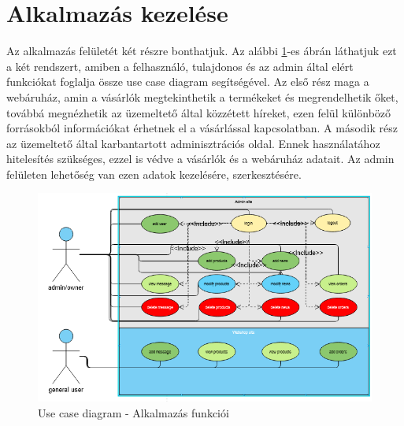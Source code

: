 \section{Alkalmazás kezelése}
Az alkalmazás felületét két részre bonthatjuk. Az alábbi \ref{fig.exemple-1}-es ábrán láthatjuk ezt a két rendszert, amiben a felhasználó, tulajdonos és az admin által elért funkciókat foglalja össze use case diagram segítségével. Az első rész maga a webáruház, amin a vásárlók megtekinthetik a termékeket és megrendelhetik őket, továbbá megnézhetik az üzemeltető által közzétett híreket, ezen felül különböző forrásokból információkat érhetnek el a vásárlással kapcsolatban. A második rész az üzemeltető által karbantartott adminisztrációs oldal. Ennek használatához hitelesítés szükséges, ezzel is védve a vásárlók és a webáruház adatait. Az admin felületen lehetőség van ezen adatok kezelésére, szerkesztésére.
\begin{figure}[H]
	\centering
	\includegraphics[width=1.0\textwidth]{images/use_case_diagram.PNG}
	\caption{Use case diagram - Alkalmazás funkciói}
	\label{fig.exemple-1}
\end{figure}

